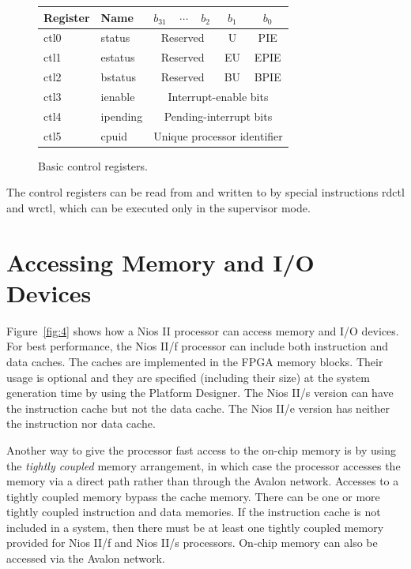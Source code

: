 \documentclass[11pt, twoside, pdftex]{article}
\begin{document}
\begin{figure}[H]
\begin{center}
\begin{tabular}{|l|l|lll|c|c|} \hline 
\rule{0in}{0.1in}{\bf Register} & {\bf Name} & $b_{31}$ & $\cdots$ & $b_2$ & $b_1$ & $b_0$ \\ \hline
ctl0 & status & \multicolumn{3}{|c|}{Reserved} & U & PIE \\ 
ctl1 & estatus & \multicolumn{3}{|c|}{Reserved} & EU & EPIE \\ 
ctl2 & bstatus & \multicolumn{3}{|c|}{Reserved} & BU & BPIE \\ \hline
ctl3 & ienable & \multicolumn{5}{|c|}{Interrupt-enable bits} \\
ctl4 & ipending & \multicolumn{5}{|c|}{Pending-interrupt bits} \\
ctl5 & cpuid & \multicolumn{5}{|c|}{Unique processor identifier} \\ \hline
\end{tabular}
\end{center}
	\caption{Basic control registers.}
	\label{fig:3}
\end{figure}

\noindent
The control registers can be read from and written to by special instructions
{\sf rdctl} and {\sf wrctl}, which can be executed only in the supervisor mode.

\section{Accessing Memory and I/O Devices}

Figure~\ref{fig:4} shows how a Nios II processor can access memory and I/O devices.
For best performance, the Nios II/f processor can include both instruction and 
data caches. The caches are implemented in the FPGA memory blocks. Their usage is
optional and they are specified (including their size) at the
system generation time by using the Platform Designer. The Nios II/s version can have
the instruction cache but not the data cache. The Nios II/e version has neither the
instruction nor data cache.

Another way to give the processor fast access to the on-chip memory is by using the 
{\it tightly coupled} memory arrangement, in which case the processor accesses the
memory via a direct path rather than through the Avalon network. Accesses to a tightly
coupled memory bypass the cache memory.
There can be one or more tightly coupled instruction and data memories.
If the instruction cache is not included in a system, then there must be at least
one tightly coupled memory provided for Nios II/f and Nios II/s processors.
On-chip memory can also be accessed via the Avalon network.
\end{document}
